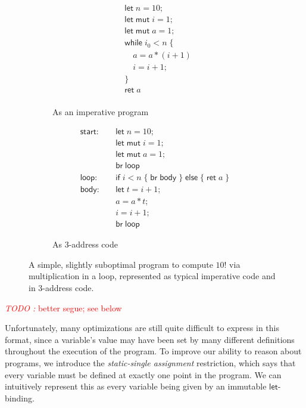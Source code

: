 \documentclass[acmsmall,screen,review]{acmart}
\newcounter{todos}
\newcommand{\TODO}[1]{{
  \stepcounter{todos}
  \begin{center}\large{\textcolor{red}{\emph{TODO \arabic{todos}:} #1}}\end{center}
}}
\newcommand{\ms}[1]{\ensuremath{\mathsf{#1}}}
\begin{document}
\begin{figure}
  \begin{subfigure}[t]{.5\textwidth}
    \begin{align*}
      & \ms{let}\;n = 10; \\
      & \ms{let\;mut}\;i = 1; \\
      & \ms{let\;mut}\;a = 1; \\
      & \ms{while}\;i_0 < n\;\{ \\
      & \quad a = a * (i + 1) \\
      & \quad i = i + 1; \\
      & \} \\
      & \ms{ret}\;a \\
    \end{align*}
    \caption{As an imperative program}
    \label{fig:fact-imp}
  \end{subfigure}%
  \begin{subfigure}[t]{.5\textwidth}
    \begin{align*}
      \ms{start}:\quad  & \ms{let}\;n = 10; \\
                        & \ms{let\;mut}\;i = 1; \\
                        & \ms{let\;mut}\;a = 1; \\
                        & \ms{br}\;\ms{loop} \\
      \ms{loop}: \quad  & \ms{if}\;i < n\;
                          \{\;\ms{br}\;\ms{body}\;\}\;
                          \ms{else}\;\{\;\ms{ret}\;a\;\} \\
      \ms{body}: \quad  & \ms{let}\;t = i + 1; \\
                        & a = a * t; \\
                        & i = i + 1; \\
                        & \ms{br}\;\ms{loop}
    \end{align*}
    \caption{As 3-address code}
    \label{fig:fact-3addr}
  \end{subfigure}
  \caption{
    A simple, slightly suboptimal program to compute $10!$ via multiplication in a loop, represented
    as typical imperative code and in 3-address code.
  }
  \Description{}
  \label{fig:fact-program}
\end{figure}

\TODO{better segue; see below}

Unfortunately, many optimizations are still quite difficult to express in this format, since a
variable's value may have been set by many different definitions throughout the execution of the
program. To improve our ability to reason about programs, we introduce the \textit{static-single
assignment} restriction, which says that every variable must be defined at exactly one point in the
program. We can intuitively represent this as every variable being given by an immutable
\ms{let}-binding.
\end{document}
